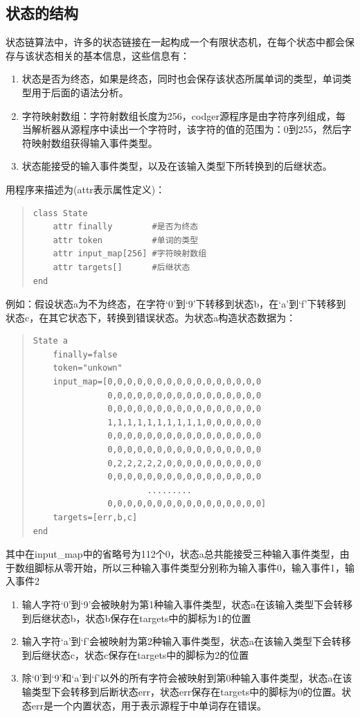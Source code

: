 \subsection{状态的结构}
状态链算法中，许多的状态链接在一起构成一个有限状态机，在每个状态中都会保存与该状态相关的基本信息，这些信息有：
\begin{enumerate}
 \item 状态是否为终态，如果是终态，同时也会保存该状态所属单词的类型，单词类型用于后面的语法分析。
 \item 字符映射数组：字符射数组长度为256，codger源程序是由字符序列组成，每当解析器从源程序中读出一个字符时，该字符的值的范围为：0到255，然后字符映射数组获得输入事件类型。
 \item 状态能接受的输入事件类型，以及在该输入类型下所转换到的后继状态。
\end{enumerate}
用程序来描述为(attr表示属性定义)：
\begin{quote}
 \begin{verbatim}
class State
    attr finally        #是否为终态
    attr token          #单词的类型
    attr input_map[256] #字符映射数组
    attr targets[]      #后继状态
end
 \end{verbatim}
\end{quote}
例如：假设状态a为不为终态，在字符`0'到`9'下转移到状态b，在`a'到`f'下转移到状态c，在其它状态下，转换到错误状态。为状态a构造状态数据为：
\begin{quote}
 \begin{verbatim}
State a
    finally=false
    token="unkown"
    input_map=[0,0,0,0,0,0,0,0,0,0,0,0,0,0,0,0
               0,0,0,0,0,0,0,0,0,0,0,0,0,0,0,0
               0,0,0,0,0,0,0,0,0,0,0,0,0,0,0,0
               1,1,1,1,1,1,1,1,1,1,0,0,0,0,0,0
               0,0,0,0,0,0,0,0,0,0,0,0,0,0,0,0
               0,0,0,0,0,0,0,0,0,0,0,0,0,0,0,0
               0,2,2,2,2,2,0,0,0,0,0,0,0,0,0,0
               0,0,0,0,0,0,0,0,0,0,0,0,0,0,0,0
                       .........
               0,0,0,0,0,0,0,0,0,0,0,0,0,0,0,0]
    targets=[err,b,c]
end  
 \end{verbatim}
\end{quote}

其中在input\_map中的省略号为112个0，状态a总共能接受三种输入事件类型，由于数组脚标从零开始，所以三种输入事件类型分别称为输入事件0，输入事件1，输入事件2
\begin{enumerate}
 \item 输人字符`0'到`9'会被映射为第1种输入事件类型，状态a在该输入类型下会转移到后继状态b，状态b保存在targets中的脚标为1的位置
 \item 输入字符`a'到`f'会被映射为第2种输入事件类型，状态a在该输入类型下会转移到后继状态c，状态c保存在targets中的脚标为2的位置
 \item 除`0'到`9'和`a'到`f'以外的所有字符会被映射到第0种输入事件类型，状态a在该输类型下会转移到后断状态err，状态err保存在targets中的脚标为0的位置。状态err是一个内置状态，用于表示源程于中单词存在错误。
\end{enumerate}

